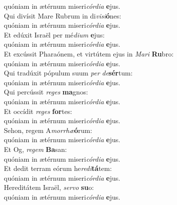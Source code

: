 \evenverse quóniam in ætérnum miseri\textit{cór}\textit{di}\textit{a} \textbf{e}jus.\\
\oddverse Qui divísit Mare Rubrum in di\textit{vi}\textit{si}\textbf{ó}nes:~\*\\
\oddverse quóniam in ætérnum miseri\textit{cór}\textit{di}\textit{a} \textbf{e}jus.\\
\evenverse Et edúxit Israël per mé\textit{di}\textit{um} \textbf{e}jus:~\*\\
\evenverse quóniam in ætérnum miseri\textit{cór}\textit{di}\textit{a} \textbf{e}jus.\\
\oddverse Et excússit Pharaónem, et virtútem ejus in \textit{Ma}\textit{ri} \textbf{Ru}bro:~\*\\
\oddverse quóniam in ætérnum miseri\textit{cór}\textit{di}\textit{a} \textbf{e}jus.\\
\evenverse Qui tradúxit pópulum suum \textit{per} \textit{de}\textbf{sér}tum:~\*\\
\evenverse quóniam in ætérnum miseri\textit{cór}\textit{di}\textit{a} \textbf{e}jus.\\
\oddverse Qui percússit \textit{re}\textit{ges} \textbf{ma}gnos:~\*\\
\oddverse quóniam in ætérnum miseri\textit{cór}\textit{di}\textit{a} \textbf{e}jus.\\
\evenverse Et occídit \textit{re}\textit{ges} \textbf{for}tes:~\*\\
\evenverse quóniam in ætérnum miseri\textit{cór}\textit{di}\textit{a} \textbf{e}jus.\\
\oddverse Sehon, regem A\textit{mor}\textit{rhæ}\textbf{ó}rum:~\*\\
\oddverse quóniam in ætérnum miseri\textit{cór}\textit{di}\textit{a} \textbf{e}jus.\\
\evenverse Et Og, \textit{re}\textit{gem} \textbf{Ba}san:~\*\\
\evenverse quóniam in ætérnum miseri\textit{cór}\textit{di}\textit{a} \textbf{e}jus.\\
\oddverse Et dedit terram eórum he\textit{re}\textit{di}\textbf{tá}tem:~\*\\
\oddverse quóniam in ætérnum miseri\textit{cór}\textit{di}\textit{a} \textbf{e}jus.\\
\evenverse Hereditátem Israël, \textit{ser}\textit{vo} \textbf{su}o:~\*\\
\evenverse quóniam in ætérnum miseri\textit{cór}\textit{di}\textit{a} \textbf{e}jus.\\
